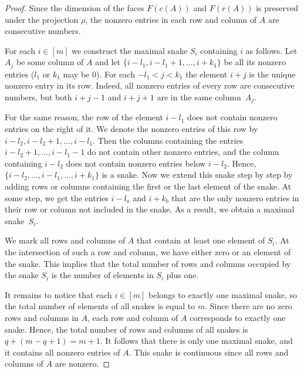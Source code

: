 \documentclass[a4paper,12pt]{amsart}
\theoremstyle{definition}
\theoremstyle{remark}
\numberwithin{equation}{section}
\begin{document}
\begin{proof} Since the dimension of the faces $F(c(A))$ and $F(r(A))$ is preserved under the projection $\rho$, the nonzero entries in each row and column of $A$ are consecutive numbers. 

For each $i \in [m]$ we construct the maximal snake $S_i$ containing $i$ as follows. 
Let $A_j$ be some column of $A$ and let $\{i - l_1, i-l_1+1, \ldots, i+k_1\}$ be all its nonzero entries ($l_1$ or $k_1$ may be 0).
For each $-l_1 < j < k_1$ the element $i + j$ is the unique nonzero entry in its row.
Indeed, all nonzero entries of every row are consecutive numbers, but both $i+j-1$ and $i+j+1$ are in the same column~$A_j$.

For the same reason, the row of the element $i-l_1$ does not contain nonzero entries on the right of it.
We denote the nonzero entries of this row by $i - l_2, i - l_2 + 1, \ldots, i-l_1$.
Then the columns containing the entries $i - l_2 + 1, \ldots, i-l_1 - 1$
do not contain other nonzero entries, and the column containing $i-l_2$ does not contain nonzero entries below $i-l_2$.
Hence, $\{ i-l_2, \ldots, i-l_1, \ldots, i+k_1\}$ is a snake.
Now we extend this snake step by step by adding rows or columns containing the first or the last element of the snake. 
At some step, we get the entries $i-l_a$ and $i+k_b$ that are the only nonzero entries in their row or column not included in the snake. 
As a result, we obtain a maximal snake~$S_i$.

We mark all rows and columns of $A$ that contain at least one element of $S_i$.
At the intersection of such a row and column, we have either zero or an element of the snake.
This implies that the total number of rows and columns occupied by the snake $S_i$ is the number of elements in $S_i$ plus one.

It remains to notice that each $i \in [m]$ belongs to exactly one maximal snake,
so the total number of elements of all snakes is equal to $m$.
Since there are no zero rows and columns in $A$, each row and column of $A$ corresponds to exactly one snake.
Hence, the total number of rows and columns of all snakes is $q + (m-q + 1) = m+1$. It follows that there is only one maximal snake, and it contains all nonzero entries of $A$. 
This snake is continuous since all rows and columns of $A$ are nonzero.
\end{proof}
\end{document}
